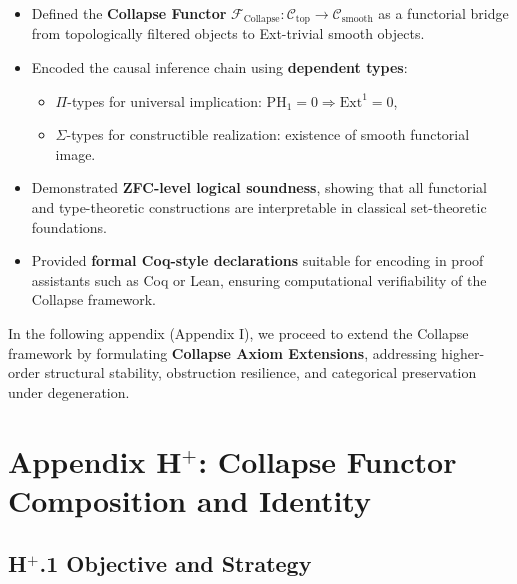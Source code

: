 \documentclass[11pt]{article}
\begin{document}
\begin{itemize}
  \item Defined the \textbf{Collapse Functor} $\mathcal{F}_{\mathrm{Collapse}} : \mathcal{C}_{\mathrm{top}} \to \mathcal{C}_{\mathrm{smooth}}$ as a functorial bridge from topologically filtered objects to Ext-trivial smooth objects.
  
  \item Encoded the causal inference chain using \textbf{dependent types}:
  \begin{itemize}
    \item $\Pi$-types for universal implication: $\mathrm{PH}_1 = 0 \Rightarrow \mathrm{Ext}^1 = 0$,
    \item $\Sigma$-types for constructible realization: existence of smooth functorial image.
  \end{itemize}
  
  \item Demonstrated \textbf{ZFC-level logical soundness}, showing that all functorial and type-theoretic constructions are interpretable in classical set-theoretic foundations.

  \item Provided \textbf{formal Coq-style declarations} suitable for encoding in proof assistants such as Coq or Lean, ensuring computational verifiability of the Collapse framework.
\end{itemize}

\vspace{1em}
In the following appendix (Appendix I), we proceed to extend the Collapse framework by formulating \textbf{Collapse Axiom Extensions}, addressing higher-order structural stability, obstruction resilience, and categorical preservation under degeneration.




\section*{Appendix H$^{+}$: Collapse Functor Composition and Identity}

\subsection*{H$^{+}$.1 Objective and Strategy}
\end{document}
